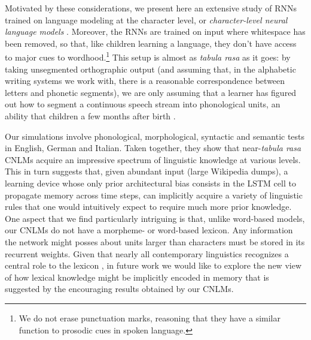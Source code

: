 Motivated by these considerations, we present here an extensive study
of RNNs trained on language modeling at the character level, or
\emph{character-level neural language models}
\cite[CNLMs,][]{Mikolov:etal:2011,Sutskever:etal:2011,Graves:2014}. Moreover,
the RNNs are trained on input where whitespace has been removed, so
that, like children learning a language, they don't have access to
major cues to wordhood.\footnote{We do not erase punctuation marks,
  reasoning that they have a similar function to prosodic cues in
  spoken language.} This setup is almost as \emph{tabula rasa} as it
goes: by taking unsegmented orthographic output (and assuming that, in
the alphabetic writing systems we work with, there is a reasonable
correspondence between letters and phonetic segments), we are only
assuming that a learner has figured out how to segment a continuous
speech stream into phonological units, an ability that children a few
months after birth \cite[e.g.,][]{Maye:etal:2002,Kuhl:2004}.

Our simulations involve phonological, morphological, syntactic and
semantic tests in English, German and Italian. Taken together, they
show that near-\emph{tabula rasa} CNLMs acquire an impressive spectrum
of linguistic knowledge at various levels.  This in turn suggests
that, given abundant input (large Wikipedia dumps), a learning device
whose only prior architectural bias consists in the LSTM cell to
propagate memory across time steps, can implicitly acquire a variety
of linguistic rules that one would intuitively expect to require much
more prior knowledge. One aspect that we find particularly intriguing
is that, unlike word-based models, our CNLMs do not have a morpheme-
or word-based lexicon. Any information the network might posses about
units larger than characters must be stored in its recurrent
weights. Given that nearly all contemporary linguistics recognizes a
central role to the lexicon \cite[see, e.g.,][for different
perspectives]{Sag:etal:2003,Radford:2006,Bresnan:etal:2016,Jezek:2016},
in future work we would like to explore the new view of how lexical
knowledge might be implicitly encoded in memory that is suggested by
the encouraging results obtained by our CNLMs.




